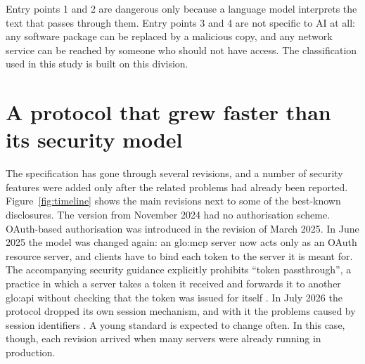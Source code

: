 \par Entry points 1 and 2 are dangerous only because a language model interprets the text that passes through them. Entry points 3 and 4 are not specific to AI at all: any software package can be replaced by a malicious copy, and any network service can be reached by someone who should not have access. The classification used in this study is built on this division.

\section{A protocol that grew faster than its security model}

\par The specification has gone through several revisions, and a number of security features were added only after the related problems had already been reported. Figure~\ref{fig:timeline} shows the main revisions next to some of the best-known disclosures. The version from November 2024 had no authorisation scheme. OAuth-based authorisation was introduced in the revision of March 2025. In June 2025 the model was changed again: an \acrshort{glo:mcp} server now acts only as an OAuth resource server, and clients have to bind each token to the server it is meant for. The accompanying security guidance explicitly prohibits ``token passthrough'', a practice in which a server takes a token it received and forwards it to another \acrshort{glo:api} without checking that the token was issued for itself \cite{mcpsecbp}. In July 2026 the protocol dropped its own session mechanism, and with it the problems caused by session identifiers \cite{mcpspec2026}. A young standard is expected to change often. In this case, though, each revision arrived when many servers were already running in production.

